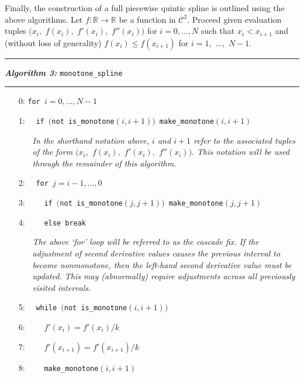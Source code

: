 \documentclass{scspaperproc}
\theoremstyle{scsthe}
\begin{document}
Finally, the construction of a full piecewise quintic spline is outlined using the above algorithms. Let $f: \mathbb{R} \rightarrow \mathbb{R}$ be a function in $\mathcal{C}^2.$ Proceed given evaluation tuples $\big(x_i,$ $f(x_i),$ $f'(x_i),$ $f''(x_i)\big)$ for $i = 0,\ldots,N$ such that $x_i < x_{i+1}$ and (without loss of generality) $f(x_i) \leq f(x_{i+1})$ for $i = 1,$ $\ldots,$ $N-1$. 

\vspace{10pt}%
\hrule%
\vspace{3pt}%
\noindent\textbf{\textit{Algorithm 3:}} \texttt{monotone\_spline}%
\vspace{3pt}%
\hrule%

\begin{itemize}
  \itemsep0pt
  \parskip0pt

\item[0:] \texttt{for }$i=0,\ldots,N-1$
\item[1:] $\quad$\texttt{if $\big($not is\_monotone$(i,i+1)\big)$  make\_monotone$(i,i+1)$}

  \begin{itemize}
    \item[] \textit{In the shorthand notation above, $i$ and $i+1$ refer to the associated tuples of the form $(x_i,$ $f(x_i),$ $f'(x_i),$ $f''(x_i)).$ This notation will be used through the remainder of this algorithm.}
  \end{itemize}

\item[2:] $\quad$\texttt{for $j=i-1,\ldots,0$}
\item[3:] $\quad\quad$\texttt{if $\big($not is\_monotone$(j,j+1)\big)$  make\_monotone$(j,j+1)$}
\item[4:] $\quad\quad$\texttt{else break}

  \begin{itemize}
    \item[] \textit{The above `for' loop will be referred to as the cascade fix. If the adjustment of second derivative values causes the previous interval to become nonmonotone, then the left-hand second derivative value must be updated. This may (abnormally) require adjustments across all previously visited intervals.}
  \end{itemize}

\item[5:] $\quad$\texttt{while $\big($not is\_monotone$(i,i+1)\big)$}
\item[6:] $\quad\quad f'(x_i) = f'(x_i) / k$
\item[7:] $\quad\quad f'(x_{i+1}) = f'(x_{i+1}) / k$
\item[8:] $\quad\quad$\texttt{make\_monotone$(i,i+1)$}


\end{itemize}
\end{document}
